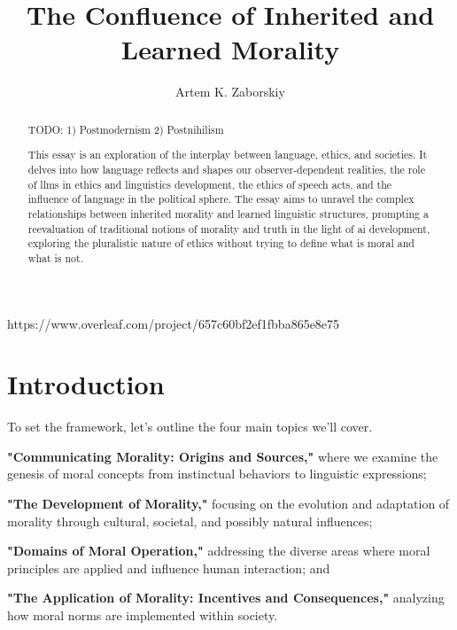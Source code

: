 \documentclass[11pt,a4]{article}
\begin{document}
\title{The Confluence of Inherited and Learned Morality}

\author{Artem K. Zaborskiy }


\maketitle

https://www.overleaf.com/project/657c60bf2ef1fbba865e8e75

\begin{abstract}

TODO:
1) Postmodernism
2) Postnihilism

This essay is an exploration of the interplay between language, ethics, and societies. It delves into how language reflects and shapes our observer-dependent realities, the role of \ac{llms} in ethics and linguistics development, the ethics of speech acts, and the influence of language in the political sphere. The essay aims to unravel the complex relationships between inherited morality and learned linguistic structures, prompting a reevaluation of traditional notions of morality and truth in the light of \ac{ai} development, exploring the pluralistic nature of ethics without trying to define what is moral and what is not.
\end{abstract}

\tableofcontents
\printacronyms




\section{Introduction}

To set the framework, let's outline the four main topics we'll cover.

\textbf{"Communicating Morality: Origins and Sources,"} where we examine the genesis of moral concepts from instinctual behaviors to linguistic expressions;

\textbf{"The Development of Morality,"} focusing on the evolution and adaptation of morality through cultural, societal, and possibly natural influences;

\textbf{"Domains of Moral Operation,"} addressing the diverse areas where moral principles are applied and influence human interaction; and

\textbf{"The Application of Morality: Incentives and Consequences,"} analyzing how moral norms are implemented within society.
\end{document}
